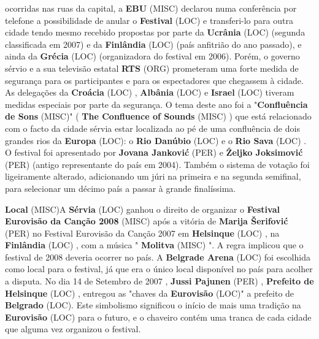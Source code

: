 \documentclass[12pt,a4paper]{article}
\begin{document}
ocorridas nas ruas da capital, a \textbf{EBU} (MISC) declarou numa conferência por telefone a possibilidade de anular o \textbf{Festival} (LOC) e transferi-lo para outra cidade tendo mesmo recebido propostas por parte da \textbf{Ucrânia} (LOC) (segunda classificada em 2007) e da \textbf{Finlândia} (LOC) (país anfitrião do ano passado), e ainda da \textbf{Grécia} (LOC) (organizadora do festival em 2006). Porém, o governo sérvio e a sua televisão estatal \textbf{RTS} (ORG) prometeram uma forte medida de segurança para os participantes e para os espectadores que chegassem à cidade. As delegações da \textbf{Croácia} (LOC) , \textbf{Albânia} (LOC) e \textbf{Israel} (LOC) tiveram medidas especiais por parte da segurança. O tema deste ano foi a "\textbf{Confluência de Sons} (MISC)" ( \textbf{The Confluence of Sounds} (MISC) ) que está relacionado com o facto da cidade sérvia estar localizada ao pé de uma confluência de dois grandes rios da \textbf{Europa} (LOC): o \textbf{Rio Danúbio} (LOC) e o \textbf{Rio Sava} (LOC) . O festival foi apresentado por \textbf{Jovana Janković} (PER) e \textbf{Željko Joksimović} (PER) (antigo representante do país em 2004). Também o sistema de votação foi ligeiramente alterado, adicionando um júri na primeira e na segunda semifinal, para selecionar um décimo país a passar à grande finalíssima.



\textbf{Local} (MISC)A \textbf{Sérvia} (LOC) ganhou o direito de organizar o \textbf{Festival Eurovisão da Canção 2008} (MISC) após a vitória de \textbf{Marija Šerifović} (PER) no Festival Eurovisão da Canção 2007 em \textbf{Helsinque} (LOC) , na \textbf{Finlândia} (LOC) , com a música " \textbf{Molitva} (MISC) ". A regra implicou que o festival de 2008 deveria ocorrer no país. A \textbf{Belgrade Arena} (LOC) foi escolhida como local para o festival, já que era o único local disponível no país para acolher a disputa. No dia 14 de Setembro de 2007 , \textbf{Jussi Pajunen} (PER) , \textbf{Prefeito de Helsinque} (LOC) , entregou as "chaves da \textbf{Eurovisão} (LOC)" a prefeito de \textbf{Belgrado} (LOC). Este simbolismo significou o início de mais uma tradição na \textbf{Eurovisão} (LOC) para o futuro, e o chaveiro contém uma tranca de cada cidade que alguma vez organizou o festival.
\end{document}
